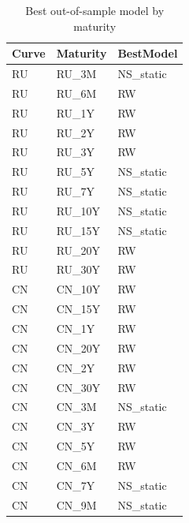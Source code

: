 \begin{table}
\caption{Best out-of-sample model by maturity}
\label{tab:6_3_best}
\begin{tabular}{lll}
\toprule
Curve & Maturity & BestModel \\
\midrule
RU & RU_3M & NS_static \\
RU & RU_6M & RW \\
RU & RU_1Y & RW \\
RU & RU_2Y & RW \\
RU & RU_3Y & RW \\
RU & RU_5Y & NS_static \\
RU & RU_7Y & NS_static \\
RU & RU_10Y & NS_static \\
RU & RU_15Y & NS_static \\
RU & RU_20Y & RW \\
RU & RU_30Y & RW \\
CN & CN_10Y & RW \\
CN & CN_15Y & RW \\
CN & CN_1Y & RW \\
CN & CN_20Y & RW \\
CN & CN_2Y & RW \\
CN & CN_30Y & RW \\
CN & CN_3M & NS_static \\
CN & CN_3Y & RW \\
CN & CN_5Y & RW \\
CN & CN_6M & RW \\
CN & CN_7Y & NS_static \\
CN & CN_9M & NS_static \\
\bottomrule
\end{tabular}
\end{table}
